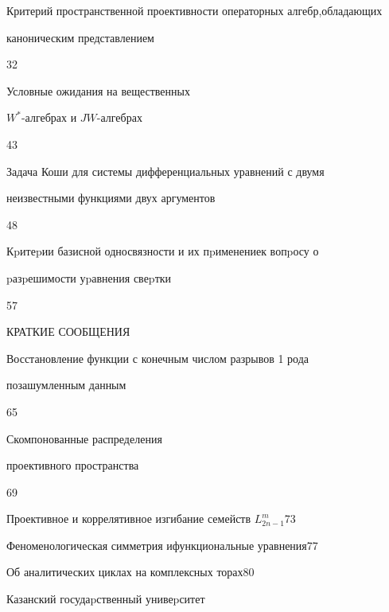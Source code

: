 

{Критерий пространственной проективности операторных алгебр,\newline обладающих


каноническим представлением}{32}




{Условные ожидания на вещественных  


$W^*$-алгебрах и $JW$-алгебрах}{43}




{Задача Коши для системы дифференциальных уравнений с двумя \newline


неизвестными функциями двух аргументов}{48}




{Кpитеpии базисной односвязности и их пpименение\newline к вопpосу о


pазpешимости уpавнения свеpтки}{57}





\bigskip





\centerline{КРАТКИЕ СООБЩЕНИЯ}


\bigskip







{Восстановление функции с конечным числом разрывов 1 рода


по\newline зашумленным данным}{65}




{Скомпонованные распределения


проективного пространства}{69}




{Проективное и коррелятивное изгибание семейств $L^m_{2n-1}$}{73}




{Феноменологическая симметрия и\newline функциональные уравнения}{77}




{Об аналитических циклах на комплексных торах}{80}








\vfill


\noindent\raisebox{2pt}{\copyright} Казанский госудаpственный унивеpситет





